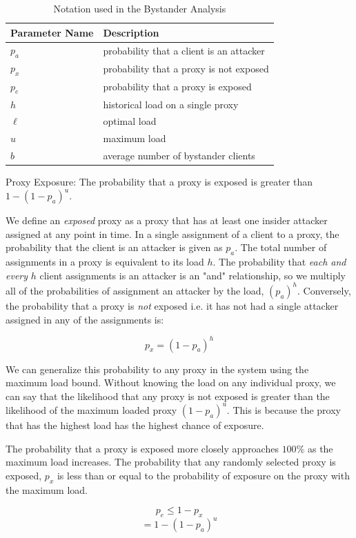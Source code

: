 \begin{table}[h]
  \centering
	\begin{tabular}{ll}
	\hline
	\cline{1-2}
	Parameter Name    & Description  \\
	\hline
    $p_a$       & probability that a client is an attacker\\
    $p_x$     & probability that a proxy is not exposed \\
    $p_e$     & probability that a proxy is exposed \\
	$h$     & historical load on a single proxy  \\
	$\ell$     & optimal load \\
	$u$     & maximum load \\
	$b$     & average number of bystander clients\\

	\hline
	\end{tabular}
  \caption{Notation used in the Bystander Analysis}
  \label{tab:vars}
\end{table}

\begin{lemma}{Proxy Exposure: The probability that a proxy is exposed is greater than $1 - (1-p_a)^{u}$.}

We define an \textit{exposed} proxy as a proxy that has at least one insider attacker assigned at any point in time. In a single assignment of a client to a proxy, the probability that the client is an attacker is given as $p_a$. The total number of assignments in a proxy is equivalent to its load $h$. The probability that \textit{each and every} $h$ client assignments is an attacker is an "and" relationship, so we multiply all of the probabilities of assignment an attacker by the load, $(p_a)^h$. Conversely, the probability that a proxy is \textit{not} exposed i.e. it has not had a single attacker assigned in any of the assignments is:

$$p_x = (1-p_a)^h$$

We can generalize this probability to any proxy in the system using the maximum load bound. Without knowing the load on any individual proxy, we can say that the likelihood that any proxy is not exposed is greater than the likelihood of the maximum loaded proxy $(1-p_a)^{u}$. This is because the proxy that has the highest load has the highest chance of exposure.

The probability that a proxy is exposed more closely approaches $100\%$ as the maximum load increases. The probability that any randomly selected proxy is exposed, $p_x$ is less than or equal to the probability of exposure on the proxy with the maximum load.


$$p_e \leq 1 - p_x$$
$$ = 1 - (1-p_a)^{u}$$

\end{lemma}

